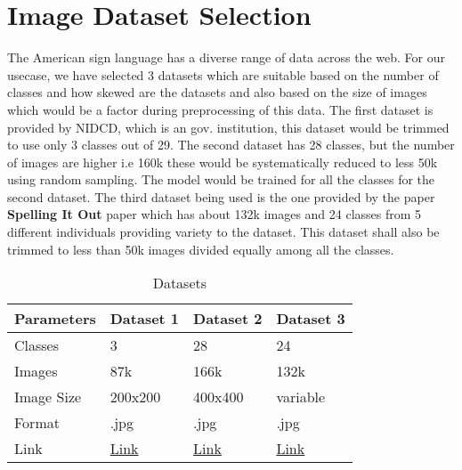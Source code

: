 \documentclass[10pt,twocolumn,letterpaper]{article}
\begin{document}
  \section{Image Dataset Selection}
  \label{sec:formatting}
The American sign language has a diverse range of data across the web. For our usecase, we have selected 3 datasets which are suitable based on the number of classes and how skewed are the datasets and also based on the size of images which would be a factor during preprocessing of this data. The first dataset is provided by NIDCD, which is an gov. institution, this dataset would be trimmed to use only 3 classes out of 29. The second dataset has 28 classes, but the number of images are higher i.e 160k these would be systematically reduced to less 50k using random sampling. The model would be trained for all the classes for the second dataset.
The third dataset being used is the one provided by the paper \textbf{Spelling It Out}  paper which has about 132k images and 24 classes from 5 different individuals providing variety to the dataset. This dataset shall also be trimmed to less than 50k images divided equally among all the classes.

  \begin{table}
    \centering
    \begin{tabular}{l l l l}
      \toprule
      Parameters & Dataset 1 & Dataset 2 & Dataset 3\\
      \midrule
      Classes & 3 & 28 & 24\\
      Images & 87k & 166k & 132k \\
      Image Size & 200x200  & 400x400 & variable\\
      Format & .jpg & .jpg & .jpg \\
      Link & \href{https://www.kaggle.com/datasets/grassknoted/asl-alphabet}{Link} & \href{https://www.kaggle.com/datasets/kapillondhe/american-sign-language}{Link} & \href{https://www.kaggle.com/datasets/mrgeislinger/asl-rgb-depth-fingerspelling-spelling-it-out}{Link}\\
      \bottomrule
    \end{tabular}
    \caption{Datasets}
    \label{tab:example}
  \end{table}


\end{document}
